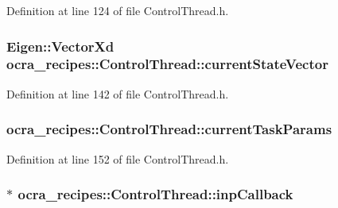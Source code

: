 Definition at line 124 of file Control\+Thread.\+h.

\subsubsection[{\texorpdfstring{current\+State\+Vector}{currentStateVector}}]{\setlength{\rightskip}{0pt plus 5cm}Eigen\+::\+Vector\+Xd ocra\+\_\+recipes\+::\+Control\+Thread\+::current\+State\+Vector\hspace{0.3cm}{\ttfamily [protected]}}\hypertarget{classocra__recipes_1_1ControlThread_afa7f90785f2768cc74b5043044d09912}{}\label{classocra__recipes_1_1ControlThread_afa7f90785f2768cc74b5043044d09912}


Definition at line 142 of file Control\+Thread.\+h.

\subsubsection[{\texorpdfstring{current\+Task\+Params}{currentTaskParams}}]{ ocra\+\_\+recipes\+::\+Control\+Thread\+::current\+Task\+Params\hspace{0.3cm}{\ttfamily [protected]}}\hypertarget{classocra__recipes_1_1ControlThread_ad2f5b157570bbcb6298d667cc264fc26}{}\label{classocra__recipes_1_1ControlThread_ad2f5b157570bbcb6298d667cc264fc26}


Definition at line 152 of file Control\+Thread.\+h.

\subsubsection[{\texorpdfstring{inp\+Callback}{inpCallback}}]{$\ast$ ocra\+\_\+recipes\+::\+Control\+Thread\+::inp\+Callback\hspace{0.3cm}{\ttfamily [protected]}}\hypertarget{classocra__recipes_1_1ControlThread_af8da6d1e1079de5d0b53dc6bbad75055}{}\label{classocra__recipes_1_1ControlThread_af8da6d1e1079de5d0b53dc6bbad75055}


